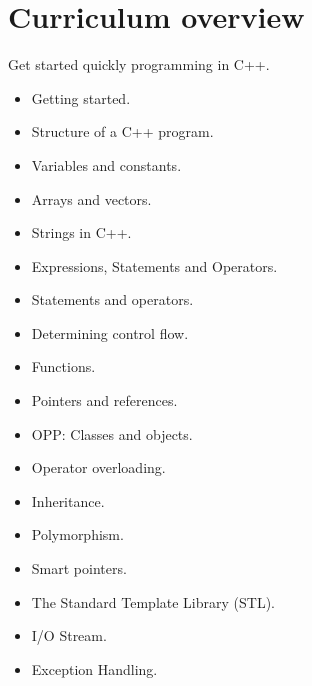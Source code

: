 \section{Curriculum overview}
Get started quickly programming in C++.
\begin{multicols}{2}
    \begin{itemize}
        \item Getting started.
        \item Structure of a C++ program.
        \item Variables and constants.
        \item Arrays and vectors.
        \item Strings in C++.
        \item Expressions, Statements and Operators.
        \item Statements and operators.
        \item Determining control flow.
        \item Functions.
        \item Pointers and references.
        \item OPP: Classes and objects.
        \item Operator overloading.
        \item Inheritance.
        \item Polymorphism.
        \item Smart pointers.
        \item The Standard Template Library (STL).
        \item I/O Stream.
        \item Exception Handling.
    \end{itemize}
\end{multicols}

